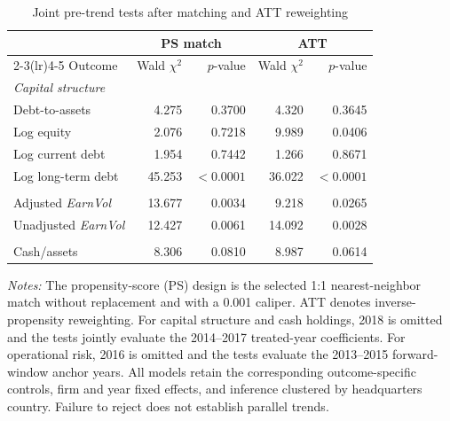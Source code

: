 \begin{table}[htbp]
    \caption{Joint pre-trend tests after matching and \acs{ATT} reweighting}
    \label{tab:appendix_robustness_matching_dynamic_pretrends}
    \centering
    \footnotesize
    \begin{tabular}{lrrrr}
        \toprule
        & \multicolumn{2}{c}{PS match} & \multicolumn{2}{c}{\acs{ATT}} \\
        \cmidrule(lr){2-3}\cmidrule(lr){4-5}
        Outcome & Wald $\chi^2$ & $p$-value & Wald $\chi^2$ & $p$-value \\
        \midrule
        \multicolumn{5}{l}{\textit{Capital structure}} \\
        Debt-to-assets & 4.275 & 0.3700 & 4.320 & 0.3645 \\
        Log equity & 2.076 & 0.7218 & 9.989 & 0.0406 \\
        Log current debt & 1.954 & 0.7442 & 1.266 & 0.8671 \\
        Log long-term debt & 45.253 & $<0.0001$ & 36.022 & $<0.0001$ \\
        \addlinespace
        \multicolumn{5}{l}{\textit{Operational risk}} \\
        Adjusted \textit{EarnVol} & 13.677 & 0.0034 & 9.218 & 0.0265 \\
        Unadjusted \textit{EarnVol} & 12.427 & 0.0061 & 14.092 & 0.0028 \\
        \addlinespace
        \multicolumn{5}{l}{\textit{Cash holdings}} \\
        Cash/assets & 8.306 & 0.0810 & 8.987 & 0.0614 \\
        \bottomrule
    \end{tabular}

    \parbox{\textwidth}{\vspace{0.35em}\footnotesize\textit{Notes:} The propensity-score (PS) design is the selected 1:1 nearest-neighbor match without replacement and with a 0.001 caliper. \acs{ATT} denotes inverse-propensity reweighting. For capital structure and cash holdings, 2018 is omitted and the tests jointly evaluate the 2014--2017 treated-year coefficients. For operational risk, 2016 is omitted and the tests evaluate the 2013--2015 forward-window anchor years. All models retain the corresponding outcome-specific controls, firm and year fixed effects, and inference clustered by headquarters country. Failure to reject does not establish parallel trends.}
\end{table}
